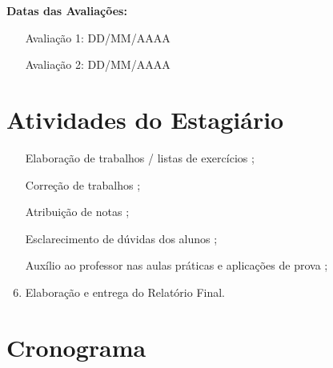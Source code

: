 \documentclass[12pt, a4paper]{article}
\newif\ifmostrarinstrucoes
\newcommand{\instrucao}[1]{%
  \ifmostrarinstrucoes
  \begin{tcolorbox}[colback=instrbg, colframe=dccblue, arc=2mm, boxrule=0.6pt,
    title=\textbf{INSTRUÇÃO (apagar na versão final)}, fonttitle=\small]
  \small #1
  \end{tcolorbox}
  \fi}
\begin{document}
\textbf{Datas das Avaliações:}
\begin{itemize}
    \item [Avaliação 1: DD/MM/AAAA]
    \item [Avaliação 2: DD/MM/AAAA]
\end{itemize}

\section{Atividades do Estagiário} \label{sec:atividades}
\instrucao{Item 3 das Diretrizes: indique as atividades e tarefas que ficarão sob sua responsabilidade. Seja específico e realista; elas serão cobradas no Relatório Final. Exemplos comuns: elaboração e correção de trabalhos ou listas, atribuição de notas, esclarecimento de dúvidas, auxílio em aulas práticas e aplicação de provas, preparação de material didático, elaboração do relatório. Edite, remova ou acrescente itens.}
\begin{enumerate}
    \item [Elaboração de trabalhos / listas de exercícios];
    \item [Correção de trabalhos];
    \item [Atribuição de notas];
    \item [Esclarecimento de dúvidas dos alunos];
    \item [Auxílio ao professor nas aulas práticas e aplicações de prova];
    \item Elaboração e entrega do Relatório Final.
\end{enumerate}

\section{Cronograma} \label{sec:cronograma}
\instrucao{Item 4 das Diretrizes: cronograma de aulas e avaliações do semestre, indicando sua participação ao longo do tempo. Inclua uma linha por aula ou evento (use ``---'' em feriados) e as datas de elaboração/correção dos trabalhos e de entrega do Relatório Final. Datas devem seguir o calendário acadêmico da UFMG.}
\end{document}
